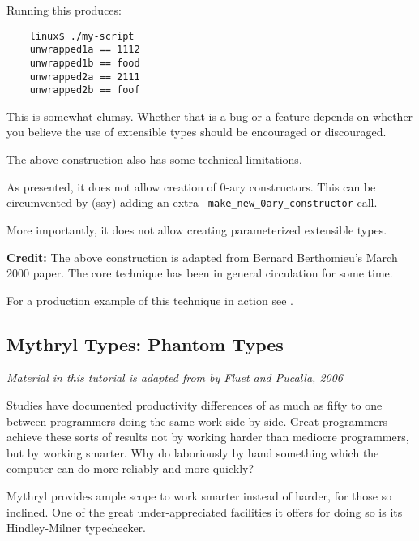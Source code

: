Running this produces:

\begin{verbatim}
    linux$ ./my-script
    unwrapped1a == 1112
    unwrapped1b == food
    unwrapped2a == 2111
    unwrapped2b == foof
\end{verbatim}


This is somewhat clumsy.  Whether that is a bug or a feature depends 
on whether you believe the use of extensible types should be encouraged 
or discouraged.

The above construction also has some technical limitations.

As presented, it does not allow creation of 0-ary constructors.  This 
can be circumvented by (say) adding an extra {\tt 
make\_new\_0ary\_constructor} call.

More importantly, it does not allow creating parameterized extensible 
types.

{\bf Credit:} The above construction is adapted from Bernard Berthomieu's 
March 2000 
 paper. 
The core technique has been in general circulation for some time.

For a production example of this technique in action see 
.

\cutend*

\subsection{Mythryl Types:  Phantom Types}

{\it \tiny Material in this tutorial is adapted from 
 by Fluet and Pucalla, 2006}

Studies have documented productivity differences of as much as fifty  
to one between programmers doing the same work side by side.  Great 
programmers achieve these sorts of results not by working harder than 
mediocre programmers, but by working smarter.  Why do laboriously by 
hand something which the computer can do more reliably and more quickly?

Mythryl provides ample scope to work smarter instead of harder, for those 
so inclined.  One of the great under-appreciated facilities it offers for 
doing so is its Hindley-Milner typechecker.

